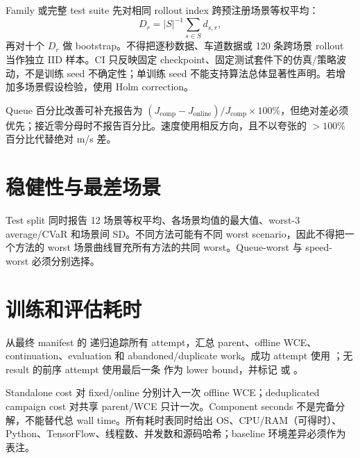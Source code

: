 Family 或完整 test suite 先对相同 rollout index 跨预注册场景等权平均：
\[
D_r=|S|^{-1}\sum_{s\in S}d_{s,r},
\]
再对十个 $D_r$ 做 bootstrap。不得把逐秒数据、车道数据或 120 条跨场景 rollout 当作独立 IID 样本。CI 只反映固定 checkpoint、固定测试套件下的仿真/策略波动，不是训练 seed 不确定性；单训练 seed 不能支持算法总体显著性声明。若增加多场景假设检验，使用 Holm correction。

Queue 百分比改善可补充报告为 $(J_{\mathrm{comp}}-J_{\mathrm{online}})/J_{\mathrm{comp}}\times100\%$，但绝对差必须优先；接近零分母时不报告百分比。速度使用相反方向，且不以夸张的 $>100\%$ 百分比代替绝对 m/s 差。

\section{稳健性与最差场景}
Test split 同时报告 12 场景等权平均、各场景均值的最大值、worst-3 average/CVaR 和场景间 SD。不同方法可能有不同 worst scenario，因此不得把一个方法的 worst 场景曲线冒充所有方法的共同 worst。Queue-worst 与 speed-worst 必须分别选择。

\section{训练和评估耗时}
从最终 manifest 的  递归追踪所有 attempt，汇总 parent、offline WCE、continuation、evaluation 和 abandoned/duplicate work。成功 attempt 使用 ；无 result 的前序 attempt 使用最后一条  作为 lower bound，并标记  或 。

Standalone cost 对 fixed/online 分别计入一次 offline WCE；deduplicated campaign cost 对共享 parent/WCE 只计一次。Component seconds 不是完备分解，不能替代总 wall time。所有耗时表同时给出 OS、CPU/RAM（可得时）、Python、TensorFlow、线程数、并发数和源码哈希；baseline 环境差异必须作为表注。
